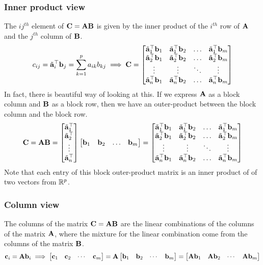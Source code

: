 \subsubsection{Inner product view}
The $ij^{th}$ element of $\mathbf{C} = \mathbf{A}\mathbf{B}$ is given by the inner product of the $i^{th}$ row of $\mathbf{A}$ and the $j^{th}$ column of $\mathbf{B}$.
\begin{equation}
    c_{ij} = \tilde{\mf{a}}_i^\top \mf{b}_j = \sum_{k=1}^{p} a_{ik}b_{kj} \implies \mf{C} = \bmxc \tilde{\mf{a}}_1^\top\mf{b}_1 & \tilde{\mf{a}}_1^\top\mf{b}_2 & \ldots & \tilde{\mf{a}}_1^\top\mf{b}_m \\
    \tilde{\mf{a}}_2^\top\mf{b}_1 & \tilde{\mf{a}}_2^\top\mf{b}_2 & \ldots & \tilde{\mf{a}}_2^\top\mf{b}_m \\
    \vdots & \vdots & \ddots & \vdots \\
    \tilde{\mf{a}}_n^\top\mf{b}_1 & \tilde{\mf{a}}_n^\top\mf{b}_2 & \ldots & \tilde{\mf{a}}_n^\top\mf{b}_m
    \emx
    \label{eq:ch02-mat-mult-inner-prod}
\end{equation}
In fact, there is beautiful way of looking at this. If we express $\mathbf{A}$ as a block column and $\mathbf{B}$ as a block row, then we have an outer-product between the block column and the block row.
\begin{equation}
    \mf{C} = \mf{A}\mf{B} = \bmxc \tilde{\mf{a}}_1^\top \\ \tilde{\mf{a}}_2^\top \\ \vdots \\ \tilde{\mf{a}}_n^\top \emx \bmx \mf{b}_1 & \mf{b}_2 & \ldots & \mf{b}_m \emx = \bmxc \tilde{\mf{a}}_1^\top\mf{b}_1 & \tilde{\mf{a}}_1^\top\mf{b}_2 & \ldots & \tilde{\mf{a}}_1^\top\mf{b}_m \\
    \tilde{\mf{a}}_2^\top\mf{b}_1 & \tilde{\mf{a}}_2^\top\mf{b}_2 & \ldots & \tilde{\mf{a}}_2^\top\mf{b}_m \\
    \vdots & \vdots & \ddots & \vdots \\
    \tilde{\mf{a}}_n^\top\mf{b}_1 & \tilde{\mf{a}}_n^\top\mf{b}_2 & \ldots & \tilde{\mf{a}}_n^\top\mf{b}_m
    \emx
    \label{eq:ch02-mat-mult-inner-prod-vec}
\end{equation}
Note that each entry of this block outer-product matrix is an inner product of of two vectors from $\mathbb{R}^p$.

\subsubsection{Column view}
The columns of the matrix $\mathbf{C} = \mathbf{A}\mathbf{B}$ are the linear combinations of the columns of the matrix $\mathbf{A}$, where the mixture for the linear combination come from the columns of the matrix $\mathbf{B}$.
\begin{equation}
    \mf{c}_i = \mf{A}\mf{b}_i \implies \bmx \mf{c}_1 & \mf{c}_2 & \cdots & \mf{c}_m \emx = \mf{A} \bmx \mf{b}_1 & \mf{b}_2 & \cdots & \mf{b}_m \emx = \bmx \mf{A}\mf{b}_1 & \mf{A}\mf{b}_2 & \cdots & \mf{A}\mf{b}_m \emx
    \label{eq:ch02-mat-mult-col-view}
\end{equation}

